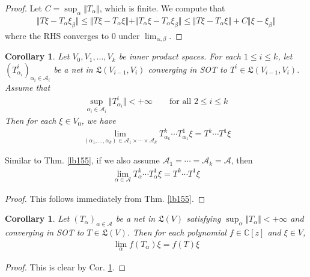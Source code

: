 \documentclass[12pt,b5paper,notitlepage]{article}
\theoremstyle{definition}
\theoremstyle{plain}
\newtheorem{co}[df]{Corollary}
\newcommand{\fk}{\mathfrak}
\newcommand{\scr}{\mathscr}
\newcommand{\Cbb}{\mathbb C}
\numberwithin{equation}{section}
\begin{document}
\begin{proof}
Let $C=\sup_\alpha\Vert T_\alpha\Vert$, which is finite. We compute that
\begin{align*}
\Vert T\xi-T_\alpha\xi_\beta\Vert\leq\Vert T\xi-T_\alpha\xi\Vert+\Vert T_\alpha\xi-T_\alpha\xi_\beta\Vert\leq \Vert T\xi-T_\alpha\xi\Vert+C\Vert\xi-\xi_\beta\Vert
\end{align*}
where the RHS converges to $0$ under $\lim_{\alpha,\beta}$.
\end{proof}


\begin{co}\label{lb159}
Let $V_0,V_1,\dots,V_k$ be inner product spaces. For each $1\leq i\leq k$, let $(T^i_{\alpha_i})_{\alpha_i\in\scr A_i}$ be a net in $\fk L(V_{i-1},V_i)$ converging in SOT to $T^i\in\fk L(V_{i-1},V_i)$. Assume that
\begin{align*}
\sup_{\alpha_i\in\scr A_i}\Vert T^i_{\alpha_i}\Vert<+\infty\qquad\text{for all }2\leq i\leq k
\end{align*}
Then for each $\xi\in V_0$, we have
\begin{align*}
\lim_{(\alpha_1,\dots,\alpha_k)\in\scr A_1\times\cdots\times\scr A_k}T^k_{\alpha_k}\cdots T^1_{\alpha_1}\xi= T^k\cdots T^1\xi
\end{align*}
\end{co}

Similar to Thm. \ref{lb155}, if we also assume $\scr A_1=\cdots=\scr A_k=\scr A$, then
\begin{align*}
\lim_{\alpha\in\scr A} T^k_\alpha\cdots T^1_\alpha\xi=T^k\cdots T^1\xi
\end{align*}


\begin{proof}
This follows immediately from Thm. \ref{lb155}.
\end{proof}


\begin{co}\label{lb161}
Let $(T_\alpha)_{\alpha\in\scr A}$ be a net in $\fk L(V)$ satisfying $\sup_\alpha\Vert T_\alpha\Vert<+\infty$ and converging in SOT to $T\in\fk L(V)$. Then for each polynomial $f\in\Cbb[z]$ and $\xi\in V$,
\begin{align*}
\lim_\alpha f(T_\alpha)\xi=f(T)\xi
\end{align*}
\end{co}


\begin{proof}
This is clear by Cor. \ref{lb159}.
\end{proof}
\end{document}
